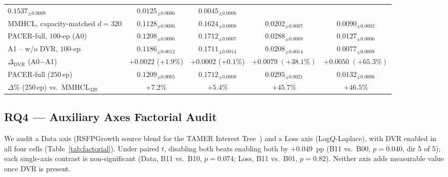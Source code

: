 \documentclass[conference]{IEEEtran}
\newcommand{\dvr}{DVR\xspace}
\begin{document}
\begin{table}[!htbp]
{\begin{tabular}{lcccc}
  $0.1537_{\pm 0.0009}$ &
  $0.0125_{\pm 0.0006}$ &
  $0.0045_{\pm 0.0006}$ \\
MMHCL, capacity-matched $d{=}320$ &
  $0.1128_{\pm 0.0006}$ &
  $0.1624_{\pm 0.0008}$ &
  $0.0202_{\pm 0.0007}$ &
  $0.0090_{\pm 0.0002}$ \\
PACER-full, $100$-ep (A0) &
  $0.1208_{\pm 0.0006}$ &
  $0.1712_{\pm 0.0007}$ &
  $0.0288_{\pm 0.0008}$ &
  $0.0127_{\pm 0.0006}$ \\
A1 -- w/o \dvr, $100$-ep &
  $0.1186_{\pm 0.0012}$ &
  $0.1711_{\pm 0.0014}$ &
  $0.0208_{\pm 0.0014}$ &
  $0.0077_{\pm 0.0008}$ \\
$\Delta_{\text{DVR}}$ (A0$-$A1) &
  $+0.0022$ ($+1.9\%$) &
  $+0.0002$ ($+0.1\%$) &
  $\mathbf{+0.0079\;({+}38.1\%)}$ &
  $\mathbf{+0.0050\;({+}65.3\%)}$ \\
\midrule
PACER-full ($250$\,ep) &
  $0.1209_{\pm 0.0005}$ &
  $0.1712_{\pm 0.0008}$ &
  $0.0295_{\pm 0.0021}$ &
  $0.0132_{\pm 0.0006}$ \\
$\Delta\%$ ($250$\,ep) vs.\ MMHCL$_{320}$ &
  $+7.2\%$ &
  $+5.4\%$ &
  $+45.7\%$ &
  $+46.5\%$ \\
\bottomrule
\end{tabular}%
}
\end{table}

\subsection{RQ4 --- Auxiliary Axes Factorial Audit}
\label{sec:factorial}

We audit a Data axis (RSFPGrowth source blend for the TAMER Interest
Tree~\cite{meng2025tamer}) and a Loss axis (Log$Q$-Laplace), with
\dvr enabled in all four cells (Table~\ref{tab:factorial}). Under
paired $t$, disabling both beats enabling both by $+0.049$~pp (B11
vs.\ B00, $p{=}0.040$, dir 5 of 5); each single-axis contrast is
non-significant (Data, B11 vs.\ B10, $p{=}0.074$; Loss, B11 vs.\ B01,
$p{=}0.82$). Neither axis adds measurable value once \dvr is present.
\end{document}
